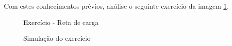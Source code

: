 Com estes conhecimentos prévios, análise o seguinte exercício da imagem \ref{fig:Circuito05}.

\begin{figure}[H]
    \centering
    \caption{Exercício - Reta de carga}
    \vspace{-0.3cm}
    \label{fig:Circuito05}
\end{figure}

\begin{figure}[H]
    \centering
    \caption{Simulação do exercício}
    \vspace{-0.3cm}
    \label{fig:SimulacaoCircuito05}
\end{figure}

